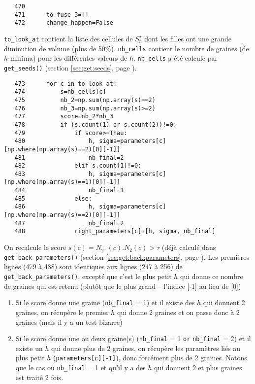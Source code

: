 \documentclass{article}
\def \mycolor {red}
\begin{document}
\color{black}
\begin{verbatim} 
   470	                
   471	    to_fuse_3=[]
   472	    change_happen=False
\end{verbatim} 
\color{\mycolor}
\verb|to_look_at| contient la liste des cellules de $S^{\star}_t$ dont les filles ont une grande diminution de volume (plus de 50\%).
\verb|nb_cells| contient le nombre de graines (de $h$-minima) pour les diff\'erentes valeurs de $h$. \verb|nb_cells| a \'et\'e calcul\'e par \texttt{get\_seeds()} (section \ref{sec:get:seeds}, page \pageref{sec:get:seeds}).
\color{black}
\begin{verbatim} 
   473	    for c in to_look_at:
   474	        s=nb_cells[c]
   475	        nb_2=np.sum(np.array(s)==2)
   476	        nb_3=np.sum(np.array(s)>=2)
   477	        score=nb_2*nb_3
   478	        if (s.count(1) or s.count(2))!=0:
   479	            if score>=Thau:
   480	                h, sigma=parameters[c][np.where(np.array(s)==2)[0][-1]]
   481	                nb_final=2
   482	            elif s.count(1)!=0:
   483	                h, sigma=parameters[c][np.where(np.array(s)==1)[0][-1]]
   484	                nb_final=1
   485	            else:
   486	                h, sigma=parameters[c][np.where(np.array(s)==2)[0][-1]]
   487	                nb_final=2
   488	            right_parameters[c]=[h, sigma, nb_final]
\end{verbatim} 
\color{\mycolor}
On recalcule le score $s(c) = N_{2^{+}}(c) . N_{2}(c) > \tau$ (d\'ej\`a calcul\'e dans \texttt{get\_back\_parameters()} (section \ref{sec:get:back:parameters}, page \pageref{sec:get:back:parameters}).
Les premi\`eres lignes (479 \`a 488) sont identiques aux lignes (247 \`a 256) de \texttt{get\_back\_parameters()}, except\'e que c'est le plus petit $h$ qui donne ce nombre de graines qui est retenu (plut\^ot que le plus grand -- l'indice [-1] au lieu de [0])
\begin{enumerate}
\itemsep -1ex
\item Si le score donne une graine (\verb|nb_final| = 1) et il existe des $h$ qui donnent 2 graines,  on r\'ecup\`ere le premier $h$ qui donne $2$ graines   et on passe donc \`a 2 graines (mais il y a un test bizarre)

\item Si le score donne une ou deux graine(s) (\verb|nb_final| = 1 \verb|or| \verb|nb_final| = 2) et il existe un $h$ qui donne plus de  2 graines, on r\'ecup\`ere les param\`etres li\'es au plus petit $h$ (\verb|parameters[c][-1]|), donc forc\'ement plus de 2 graines. 
Notons que le cas o\`u \verb|nb_final| = 1 et qu'il y a des $h$ qui donnent 2 et plus graines est trait\'e 2 fois.

\end{enumerate}
\end{document}
